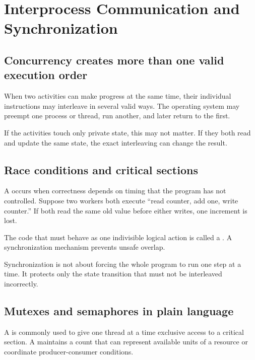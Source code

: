 \chapter{Interprocess Communication and Synchronization}\label{ch:ipc}

\section{Concurrency creates more than one valid execution order}
When two activities can make progress at the same time, their individual instructions may interleave in several valid ways. The operating system may preempt one process or thread, run another, and later return to the first.

If the activities touch only private state, this may not matter. If they both read and update the same state, the exact interleaving can change the result.

\section{Race conditions and critical sections}
A  occurs when correctness depends on timing that the program has not controlled. Suppose two workers both execute ``read counter, add one, write counter.'' If both read the same old value before either writes, one increment is lost.

The code that must behave as one indivisible logical action is called a . A synchronization mechanism prevents unsafe overlap.

\begin{keyidea}
Synchronization is not about forcing the whole program to run one step at a time. It protects only the state transition that must not be interleaved incorrectly.
\end{keyidea}

\section{Mutexes and semaphores in plain language}
A  is commonly used to give one thread at a time exclusive access to a critical section. A  maintains a count that can represent available units of a resource or coordinate producer-consumer conditions.

